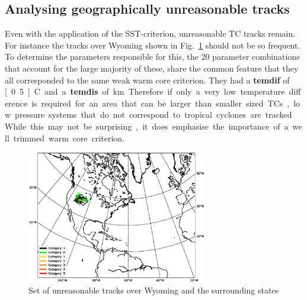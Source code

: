 \subsection*{Analysing geographically unreasonable tracks}
Even with the application of the SST-criterion, unreasonable TC tracks remain. For instance the tracks over Wyoming shown in Fig.~\ref{fig:rogue-tracks} should not be so frequent. To determine the parameters responsible for this, the 20 parameter combinations that account for the large majority of these, share the common feature that they all corresponded to the same weak warm core criterion. They had a \textbf{temdif} of \unit[0.5]{\degree C} and a \textbf{temdis} of \unit[400]{km}. Therefore if only a very low temperature difference is required for an area that can be larger than smaller sized TCs, low pressure systems that do not correspond to tropical cyclones are tracked. While this may not be surprising, it does emphasise the importance of a well trimmed warm core criterion.
\begin{figure}[ht]
	\centering
	\includegraphics[width=0.7\textwidth]{img/rogue_tracks.eps}
	\caption{Set of unreasonable tracks over Wyoming and the surrounding states}
	\label{fig:rogue-tracks}
\end{figure}
